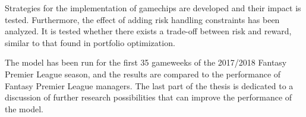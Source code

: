 \newpar 

Strategies for the implementation of gamechips are developed and their impact is tested. Furthermore, the effect of adding risk handling constraints has been analyzed. It is tested whether there exists a trade-off between risk and reward, similar to that found in portfolio optimization.

\newpar

The model has been run for the first 35 gameweeks of the 2017/2018 Fantasy Premier League season, and the results are compared to the performance of Fantasy Premier League managers. The last part of the thesis is dedicated to a discussion of further research possibilities that can improve the performance of the model.


  
\clearpage

\begin{comment}
\pagestyle{fancy}
\fancyhf{}
\renewcommand{\chaptermark}[1]{\markboth{\chaptername\ \thechapter.\ #1}{}}
\renewcommand{\sectionmark}[1]{\markright{\thesection\ #1}}
\renewcommand{\headrulewidth}{0.1ex}
\renewcommand{\footrulewidth}{0.1ex}
\fancyfoot[LE,RO]{\thepage}
\fancyhead[LE]{\leftmark}
\fancyhead[RO]{\rightmark}
\fancypagestyle{plain}{\fancyhf{}\fancyfoot[LE,RO]{\thepage}\renewcommand{\headrulewidth}{0ex}}

\pagenumbering{arabic} 				
\setcounter{page}{1}
\end{comment}

